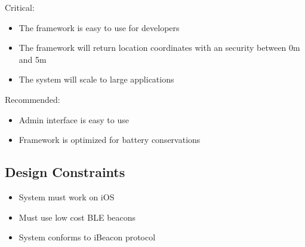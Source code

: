 Critical:
\begin{itemize}
\item The framework is easy to use for developers
\item The framework will return location coordinates with an security between 0m and 5m
\item The system will scale to large applications
\end{itemize}
Recommended:
\begin{itemize}
\item Admin interface is easy to use
\item Framework is optimized for battery conservations
\end{itemize}

\subsection{Design Constraints}

\begin{itemize}
\item System must work on iOS
\item Must use low cost BLE beacons
\item System conforms to iBeacon protocol
\end{itemize}
